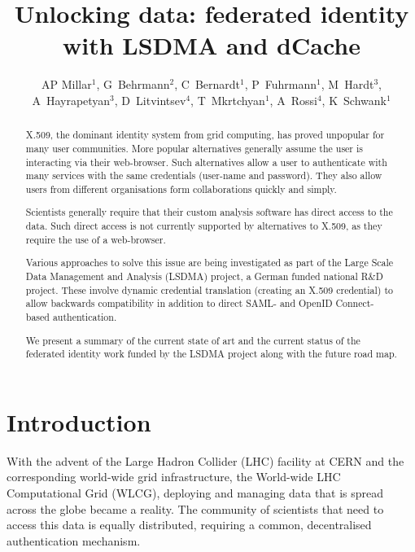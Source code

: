 \documentclass[a4paper]{jpconf}
\begin{document}
\title{Unlocking data: federated identity with LSDMA and dCache}

\author{AP Millar$^1$, G~Behrmann$^2$, C~Bernardt$^1$, P~Fuhrmann$^1$,
  M~Hardt$^3$, A~Hayrapetyan$^3$, D~Litvintsev$^4$, T~Mkrtchyan$^1$,
  A~Rossi$^4$, K~Schwank$^1$}

\address{$^1$ IT Dept., DESY, Notkestrasse 85, Hamburg, Germany}
\address{$^2$ Gerd Behrmann, Copenhagen, Denmark}
\address{$^3$ Steinbuch Centre for Computing, Hermann-von-Helmholtz-Platz 1, Karlsruhe, Germany}
\address{$^4$ Fermilab, Batavia, IL, USA}


\begin{abstract}
X.509, the dominant identity system from grid computing, has proved
unpopular for many user communities. More popular alternatives
generally assume the user is interacting via their web-browser. Such
alternatives allow a user to authenticate with many services with the
same credentials (user-name and password). They also allow users from
different organisations form collaborations quickly and simply.

Scientists generally require that their custom analysis software has
direct access to the data. Such direct access is not currently
supported by alternatives to X.509, as they require the use of a
web-browser.

Various approaches to solve this issue are being investigated as part
of the Large Scale Data Management and Analysis (LSDMA) project, a
German funded national R\&D project. These involve dynamic credential
translation (creating an X.509 credential) to allow backwards
compatibility in addition to direct SAML- and OpenID Connect-based
authentication.

We present a summary of the current state of art and the current
status of the federated identity work funded by the LSDMA project
along with the future road map.
\end{abstract}

\section{Introduction}
With the advent of the Large Hadron Collider (LHC) facility at CERN
and the corresponding world-wide grid infrastructure, the World-wide
LHC Computational Grid (WLCG), deploying and managing data that is
spread across the globe became a reality.  The community of scientists
that need to access this data is equally distributed, requiring a
common, decentralised authentication mechanism.
\end{document}
